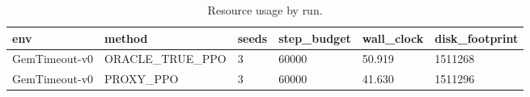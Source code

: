\begin{table}[t]
\centering
\begin{tabular}{llllll}
\toprule
env & method & seeds & step\_budget & wall\_clock & disk\_footprint \\
\midrule
GemTimeout-v0 & ORACLE\_TRUE\_PPO & 3 & 60000 & 50.919 & 1511268 \\
GemTimeout-v0 & PROXY\_PPO & 3 & 60000 & 41.630 & 1511296 \\
\bottomrule
\end{tabular}
\caption{Resource usage by run.}
\label{tab:resource-results}
\end{table}
